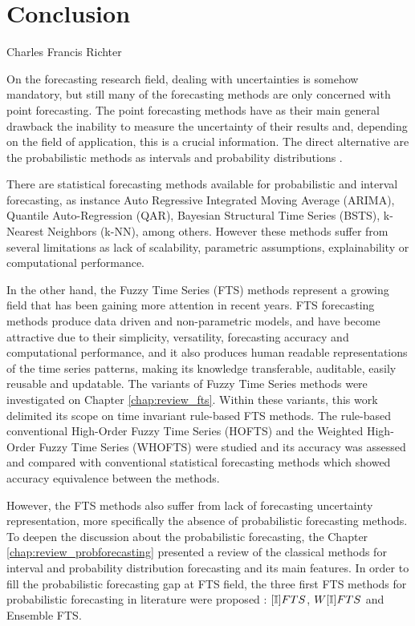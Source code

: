 \chapter[Conclusion]{Conclusion} 
 \label{chap:conclusions} 

{Charles Francis Richter}

On the forecasting research field, dealing with uncertainties is somehow mandatory, but still many of the forecasting methods are only concerned with point forecasting. The point forecasting methods have as their main general drawback the inability to measure the uncertainty of their results and, depending on the field of application, this is a crucial information. The direct alternative are the probabilistic methods as intervals and probability distributions \cite{Gneiting2014b}.

There are statistical forecasting methods available for probabilistic and interval forecasting, as instance Auto Regressive Integrated Moving Average (ARIMA), Quantile Auto-Regression (QAR), Bayesian Structural Time Series (BSTS), k-Nearest Neighbors (k-NN), among others. However these methods suffer from several limitations as lack of scalability, parametric assumptions, explainability or computational performance.

In the other hand, the Fuzzy Time Series (FTS) methods represent a growing field that has been gaining more attention in recent years. FTS forecasting methods produce data driven and non-parametric models, and have become attractive due to their simplicity, versatility, forecasting accuracy and computational performance, and it also produces human readable representations of the time series patterns, making its knowledge transferable, auditable, easily reusable and updatable. The variants of Fuzzy Time Series methods were investigated on Chapter \ref{chap:review_fts}. Within these variants, this work delimited its scope on time invariant rule-based FTS methods. The rule-based conventional High-Order Fuzzy Time Series (HOFTS) and the Weighted  High-Order Fuzzy Time Series (WHOFTS) were studied and its accuracy was assessed and compared with conventional statistical forecasting methods which showed accuracy equivalence between the methods.

However, the FTS methods also suffer from lack of forecasting uncertainty representation, more specifically the absence of probabilistic forecasting methods. To deepen the discussion about the probabilistic forecasting, the Chapter \ref{chap:review_probforecasting} presented a review of the classical methods for interval and probability distribution forecasting and its main features. In order to fill the probabilistic forecasting gap at FTS field, the three first FTS methods for probabilistic forecasting in literature were proposed : $[\mathbb{I}]FTS$, $W[\mathbb{I}]FTS$ and Ensemble FTS. 

